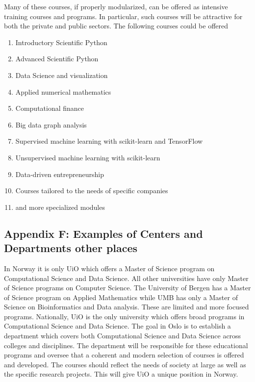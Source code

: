 \documentclass[%
oneside,                 %
final,                   %
10pt]{article}
\begin{document}
\noindent
Many of these courses, if properly modularized, can be offered as intensive training courses and programs. In particular, such courses will be attractive for both the private and public sectors. The following courses could be offered
\begin{enumerate}
\item Introductory Scientific Python

\item Advanced Scientific Python

\item Data Science and visualization

\item Applied numerical mathematics

\item Computational finance

\item Big data graph analysis

\item Supervised machine learning with scikit-learn and TensorFlow

\item Unsupervised machine learning with scikit-learn

\item Data-driven entrepreneurship

\item Courses tailored to the needs of specific companies

\item and more specialized modules
\end{enumerate}

\noindent
\subsection*{Appendix F: Examples of Centers and Departments other places}


In Norway it is only UiO which offers a Master of Science program on Computational Science and Data Science. All other universities have only Master of Science programs on Computer Science. The University of Bergen has a Master of Science  program on Applied Mathematics while UMB has only a Master of Science on Bioinformatics and Data analysis. These are limited and more focused programs. Nationally, UiO is the only university which offers broad programs in Computational Science and Data Science. 
The goal in Oslo is to establish a department which covers both Computational Science and Data Science across colleges and disciplines. The department will be responsible for these educational programs and oversee that a coherent and modern selection of courses is offered and developed. The courses should reflect the needs of society at large as well as the specific research projects.  This will give UiO a unique position in Norway. 
\end{document}
